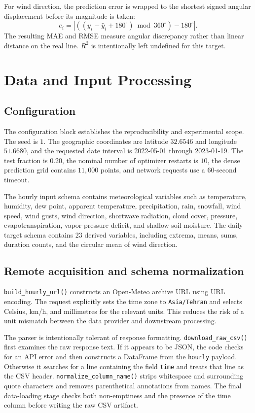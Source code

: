 \documentclass[11pt,a4paper]{article}
\newcommand{\code}[1]{\texttt{#1}}
\begin{document}
For wind direction, the prediction error is wrapped to the shortest signed angular displacement before its magnitude is taken:
\begin{equation}
 e_i = \left|\left((y_i-\hat y_i+180^\circ)\bmod 360^\circ\right)-180^\circ\right|.
\end{equation}
The resulting MAE and RMSE measure angular discrepancy rather than linear distance on the real line. $R^2$ is intentionally left undefined for this target.

\section{Data and Input Processing}
\subsection{Configuration}
The configuration block establishes the reproducibility and experimental scope. The seed is $1$. The geographic coordinates are latitude $32.6546$ and longitude $51.6680$, and the requested date interval is 2022-05-01 through 2023-01-19. The test fraction is $0.20$, the nominal number of optimizer restarts is $10$, the dense prediction grid contains $11{,}000$ points, and network requests use a 60-second timeout.

The hourly input schema contains meteorological variables such as temperature, humidity, dew point, apparent temperature, precipitation, rain, snowfall, wind speed, wind gusts, wind direction, shortwave radiation, cloud cover, pressure, evapotranspiration, vapor-pressure deficit, and shallow soil moisture. The daily target schema contains 23 derived variables, including extrema, means, sums, duration counts, and the circular mean of wind direction.

\subsection{Remote acquisition and schema normalization}
\code{build\_hourly\_url()} constructs an Open-Meteo archive URL using URL encoding. The request explicitly sets the time zone to \code{Asia/Tehran} and selects Celsius, km/h, and millimetres for the relevant units. This reduces the risk of a unit mismatch between the data provider and downstream processing.

The parser is intentionally tolerant of response formatting. \code{download\_raw\_csv()} first examines the raw response text. If it appears to be JSON, the code checks for an API error and then constructs a DataFrame from the \code{hourly} payload. Otherwise it searches for a line containing the field \code{time} and treats that line as the CSV header. \code{normalize\_column\_name()} strips whitespace and surrounding quote characters and removes parenthetical annotations from names. The final data-loading stage checks both non-emptiness and the presence of the time column before writing the raw CSV artifact.
\end{document}
